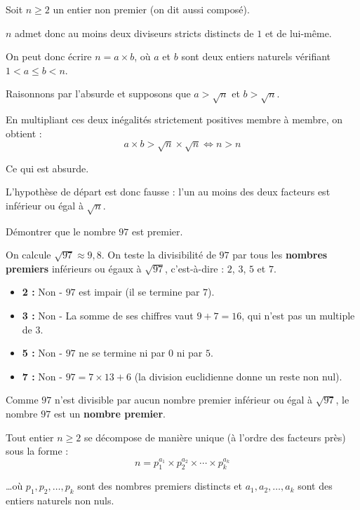\begin{demo}
	Soit $n \geqslant 2$ un entier non premier (on dit aussi composé).

	$n$ admet donc au moins deux diviseurs stricts distincts de $1$ et de lui-même.

	On peut donc écrire $n = a \times b$, où $a$ et $b$ sont deux entiers naturels vérifiant $1 < a \leqslant b < n$.

	Raisonnons par l'absurde et supposons que $a > \sqrt{n}$ et $b > \sqrt{n}$.

	En multipliant ces deux inégalités strictement positives membre à membre, on obtient :
	\[
		a \times b > \sqrt{n} \times \sqrt{n}\iff n > n
	\]

	Ce qui est absurde.

	L'hypothèse de départ est donc fausse : l'un au moins des deux facteurs est inférieur ou égal à $\sqrt{n}$.
\end{demo}
\begin{methode}
	Démontrer que le nombre $97$ est premier.

	\begin{correction}
		On calcule $\sqrt{97} \approx 9{,}8$. On teste la divisibilité de $97$ par tous les \textbf{nombres premiers} inférieurs ou égaux à $\sqrt{97}$, c'est-à-dire : $2$, $3$, $5$ et $7$.

		\begin{itemize}
			\item \textbf{2 :} Non - $97$ est impair (il se termine par $7$).
			\item \textbf{3 :} Non - La somme de ses chiffres vaut $9 + 7 = 16$, qui n'est pas un multiple de $3$.
			\item \textbf{5 :} Non - $97$ ne se termine ni par $0$ ni par $5$.
			\item \textbf{7 :} Non - $97 = 7 \times 13 + 6$ (la division euclidienne donne un reste non nul).
		\end{itemize}

		Comme $97$ n'est divisible par aucun nombre premier inférieur ou égal à $\sqrt{97}$, le nombre $97$ est un \textbf{nombre premier}.
	\end{correction}
\end{methode}

\begin{propriete}
	Tout entier $n \geqslant 2$ se décompose de manière unique (à l'ordre des facteurs près) sous la forme :
	\[
		n = p_1^{a_1} \times p_2^{a_2} \times \cdots \times p_k^{a_k}
	\]

	\ldots où $p_1, p_2, \ldots, p_k$ sont des nombres premiers distincts et $a_1, a_2, \ldots, a_k$ sont des entiers naturels non nuls.
\end{propriete}

